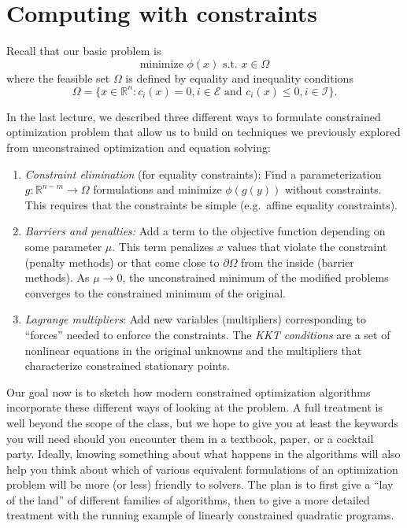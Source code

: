 \documentclass[12pt, leqno]{article} %
\providecommand{\tightlist}{%
  \setlength{\itemsep}{0pt}\setlength{\parskip}{0pt}}
\begin{document}

\section{Computing with constraints}

Recall that our basic problem is
\[\mbox{minimize } \phi(x) \mbox{ s.t. } x \in \Omega\] where the
feasible set \(\Omega\) is defined by equality and inequality conditions
\[\Omega = \{ x \in {\mathbb{R}}^n : c_i(x) = 0, i \in \mathcal{E} \mbox{ and }
    c_i(x) \leq 0, i \in \mathcal{I} \}.\]

In the last lecture, we described three different ways to formulate
constrained optimization problem that allow us to build on techniques we
previously explored from unconstrained optimization and equation
solving:

\begin{enumerate}
\def\labelenumi{\arabic{enumi}.}
\tightlist
\item
  \emph{Constraint elimination} (for equality constraints): Find a
  parameterization \(g : {\mathbb{R}}^{n-m} \rightarrow \Omega\)
  formulations and minimize \(\phi(g(y))\) without constraints. This
  requires that the constraints be simple (e.g.~affine equality
  constraints).
\item
  \emph{Barriers and penalties:} Add a term to the objective function
  depending on some parameter \(\mu\). This term penalizes \(x\) values
  that violate the constraint (penalty methods) or that come close to
  \(\partial \Omega\) from the inside (barrier methods). As
  \(\mu \rightarrow 0\), the unconstrained minimum of the modified
  problems converges to the constrained minimum of the original.
\item
  \emph{Lagrange multipliers}: Add new variables (multipliers)
  corresponding to ``forces'' needed to enforce the constraints. The
  \emph{KKT conditions} are a set of nonlinear equations in the original
  unknowns and the multipliers that characterize constrained stationary
  points.
\end{enumerate}

Our goal now is to sketch how modern constrained optimization algorithms
incorporate these different ways of looking at the problem. A full
treatment is well beyond the scope of the class, but we hope to give you
at least the keywords you will need should you encounter them in a
textbook, paper, or a cocktail party. Ideally, knowing something about
what happens in the algorithms will also help you think about which of
various equivalent formulations of an optimization problem will be more
(or less) friendly to solvers. The plan is to first give a ``lay of the
land'' of different families of algorithms, then to give a more detailed
treatment with the running example of linearly constrained quadratic
programs.
\end{document}
